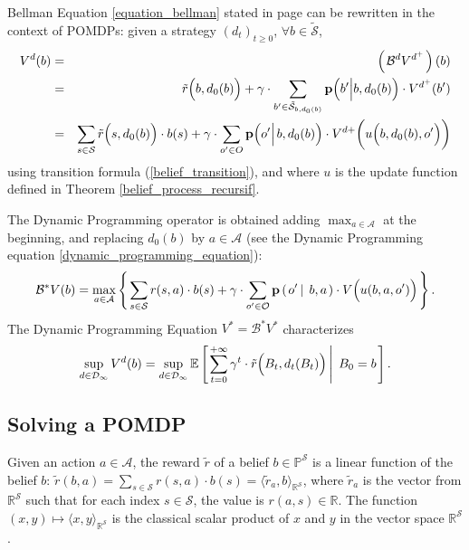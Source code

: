Bellman Equation \ref{equation_bellman} stated in page \pageref{equation_bellman} 
can be rewritten in the context of POMDPs:
given a strategy $(d_t)_{t \geqslant 0}$, $\forall b \in \tilde{\mathcal{S}}$,
\begin{eqnarray*}
V^d(b) & = & \left( \left. \mathcal{B}^d V^{d^+} \right. \right)(b) \\
& = & \tilde{r} \Big( b,d_0(b) \Big) + \gamma \cdot \sum_{b' \in \tilde{\mathcal{S}}_{b,d_0(b)} } \textbf{p} \Big( b' \Big\vert b,d_{0}(b) \Big) \cdot V^{d^+}(b') \\
& = & \sum_{s \in \mathcal{S}} \tilde{r} \Big( s,d_0(b) \Big) \cdot b(s)  + \gamma \cdot \sum_{o' \in O}  \textbf{p} \Big( o' \Big\vert \hspace{0.05cm} b, d_0(b) \Big) \cdot V^{d+} \bigg( u \Big(b, d_0(b), o' \Big) \bigg) 
\end{eqnarray*} 
using transition formula (\ref{belief_transition}), and where $u$ is the update function defined in Theorem \ref{belief_process_recursif}.

The Dynamic Programming operator
is obtained adding $\max_{a \in \mathcal{A}}$ at the beginning, 
and replacing $d_0(b)$ by $a \in \mathcal{A}$ 
(see the Dynamic Programming equation \ref{dynamic_programming_equation}):
\begin{equation}
\label{equation_bellmanOperator_POMDP}
 \mathcal{B}^* V(b) = \max_{a \in \mathcal{A}} \left\{ \left.  \sum_{s \in \mathcal{S}} r(s,a) \cdot b(s) + \gamma \cdot \sum_{o' \in \mathcal{O}} \textbf{p} \left( \left. o' \, \right| \left. \, b , a  \right. \right) \cdot V \Big( u(b,a,o')  \Big)  \right. \right\}. 
\end{equation}
The Dynamic Programming Equation $V^* = \mathcal{B}^* V^*$ characterizes \[ \sup_{d \in \mathcal{D}_{\infty}} V^{d}(b) = \sup_{d \in \mathcal{D}_{\infty}} \mathbb{E} \left[ \left.  \sum_{t=0}^{+ \infty} \gamma^t \cdot \tilde{r}\Big(B_t,d_t(B_t)\Big) \, \right| \left. \, B_0=b   \right. \right]. \]


\subsection{Solving a POMDP}
Given an action $a \in \mathcal{A}$, 
the reward $\tilde{r}$ of a belief $b \in \mathbb{P}^{\mathcal{S}}$ 
is a linear function of the belief $b$: $\tilde{r}(b,a) = \sum_{s \in \mathcal{S}} r(s,a) \cdot b(s) = \langle \tilde{r}_a, b \rangle_{\mathbb{R}^{\mathcal{S}}}$,
where $\tilde{r}_a$ is the vector from $\mathbb{R}^{\mathcal{S}}$ 
such that for each index $s \in \mathcal{S}$, the value is $r(a,s) \in \mathbb{R}$. 
The function $(x,y) \mapsto \langle x , y \rangle_{\mathbb{R}^{\mathcal{S}}}$
is the classical scalar product of $x$ and $y$ in the vector space $\mathbb{R}^{\mathcal{S}}$.

